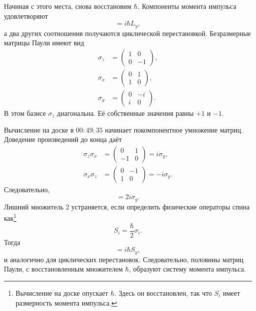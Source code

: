 Начиная с этого места, снова восстановим \(\hbar\). Компоненты момента импульса удовлетворяют
\begin{equation}
[L_{z},L_{x}]=i\hbar L_{y},
\end{equation}
а два других соотношения получаются циклической перестановкой. Безразмерные матрицы Паули имеют вид
\begin{equation}
\begin{aligned}
\sigma_{z}&=
\begin{pmatrix}
1&0\\
0&-1
\end{pmatrix},\\[0.4em]
\sigma_{x}&=
\begin{pmatrix}
0&1\\
1&0
\end{pmatrix},\\[0.4em]
\sigma_{y}&=
\begin{pmatrix}
0&-i\\
i&0
\end{pmatrix}.
\end{aligned}
\end{equation}
В этом базисе \(\sigma_{z}\) диагональна. Её собственные значения равны \(+1\) и
\(-1\).

\begin{classroomqa}
\end{classroomqa}

Вычисление на доске в \(00{:}49{:}35\) начинает покомпонентное
умножение матриц. Доведение произведений до конца даёт
\begin{align}
\sigma_{z}\sigma_{x}
&=
\begin{pmatrix}
0&1\\
-1&0
\end{pmatrix}
=i\sigma_{y},\\
\sigma_{x}\sigma_{z}
&=
\begin{pmatrix}
0&-1\\
1&0
\end{pmatrix}
=-i\sigma_{y}.
\end{align}
Следовательно,
\begin{equation}
[\sigma_{z},\sigma_{x}]=2i\sigma_{y}.
\end{equation}
Лишний множитель 2 устраняется, если определить физические операторы спина как\footnote{Вычисление на доске опускает \(\hbar\). Здесь он восстановлен, так что \(S_i\) имеет размерность момента импульса.}
\begin{equation}
S_{i}=\frac{\hbar}{2}\sigma_{i}.
\end{equation}
Тогда
\begin{equation}
[S_{z},S_{x}]=i\hbar S_{y},
\end{equation}
и аналогично для циклических перестановок. Следовательно, половины матриц Паули, с восстановленным множителем \(\hbar\), образуют систему момента импульса.

